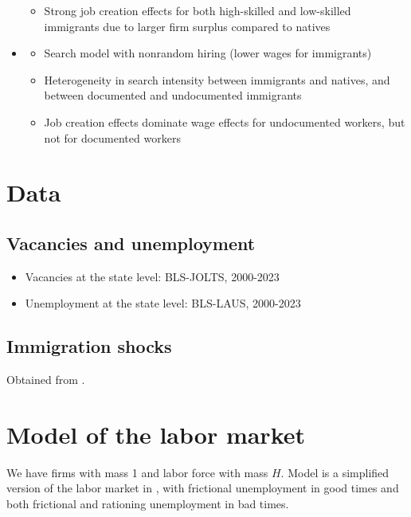 \documentclass[12pt]{article}
\begin{document}
\begin{itemize}
\begin{itemize}
        \item Strong job creation effects for both high-skilled and low-skilled immigrants due to larger firm surplus compared to natives
    \end{itemize}
    \item \textcite{albert_AEJMacro_2021_immigration_job_creation_vs_competition}
    \begin{itemize}
        \item Search model with nonrandom hiring (lower wages for immigrants)
        \item Heterogeneity in search intensity between immigrants and natives, and between documented and undocumented immigrants
        \item Job creation effects dominate wage effects for undocumented workers, but not for documented workers
    \end{itemize}
\end{itemize}

\section{Data}

\subsection{Vacancies and unemployment}
\begin{itemize}
    \item Vacancies at the state level: BLS-JOLTS, 2000-2023
    \item Unemployment at the state level: BLS-LAUS, 2000-2023
\end{itemize}

\subsection{Immigration shocks}
Obtained from \textcite{burchardi_chaney_hassan_tarquinio_terry_NBERWP_2020_immigration_innovation}.

\section{Model of the labor market}
We have firms with mass 1 and labor force with mass $H$.
Model is a simplified version of the labor market in \textcite{michaillat_AER_2012_rationing_unemployment_bad_times}, with frictional unemployment in good times and both frictional and rationing unemployment in bad times.
\end{document}
